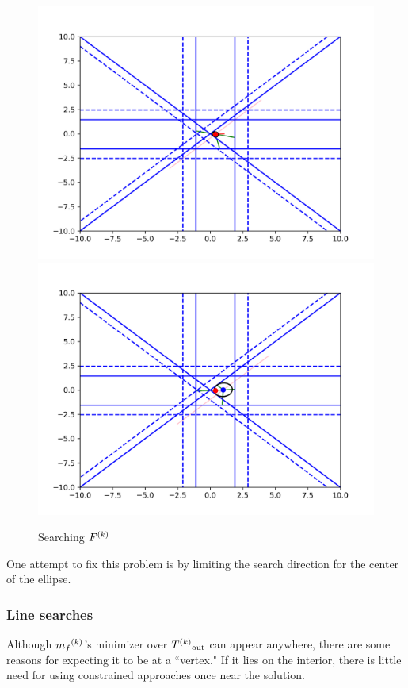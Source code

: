 \begin{figure}[h]
    \centering
    \includegraphics[scale=0.4]{images/everything_runs_1.png}
    \includegraphics[scale=0.4]{images/everything_runs_2.png}
    \caption{Searching ${F}^{(k)}$}
    \label{ellipse_runs_away}
\end{figure}


One attempt to fix this problem is by limiting the search direction for the center of the ellipse.


\subsubsection{Line searches}
Although ${{m}_f}^{(k)}$'s minimizer over ${T^{(k)}}_{\text{out}}$  can appear anywhere, there are some reasons for expecting it to be at a ``vertex."
If it lies on the interior, there is little need for using constrained approaches once near the solution.

